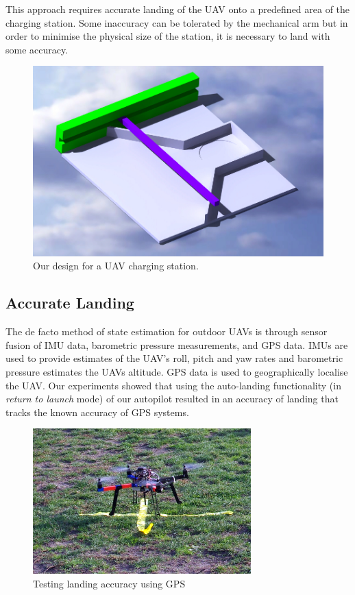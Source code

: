 \documentclass[10pt]{scrartcl} %
\begin{document}
This approach requires accurate landing of the UAV onto a predefined area of the charging station. Some inaccuracy can be tolerated by the mechanical arm but in order to minimise the physical size of the station, it is necessary to land with some accuracy. 

\begin{figure}[h]
    \centering
    \includegraphics[width=\textwidth]{images/catia.jpg}
    \caption{Our design for a UAV charging station.}
    \label{fig:catia}
\end{figure}


\subsection{Accurate Landing}
The de facto method of state estimation for outdoor UAVs is through sensor fusion of IMU data, barometric pressure measurements, and GPS data. IMUs are used to provide estimates of the UAV's roll, pitch and yaw rates and barometric pressure estimates the UAVs altitude. GPS data is used to geographically localise the UAV. Our experiments showed that using the auto-landing functionality (in \textit{return to launch} mode) of our autopilot resulted in an accuracy of landing that tracks the known accuracy of GPS systems. 

\begin{figure}[h]
    \centering
    \includegraphics[width=0.75\textwidth]{images/marker.JPG}
    \caption{Testing landing accuracy using GPS}
    \label{fig:marker}
\end{figure}
\end{document}
